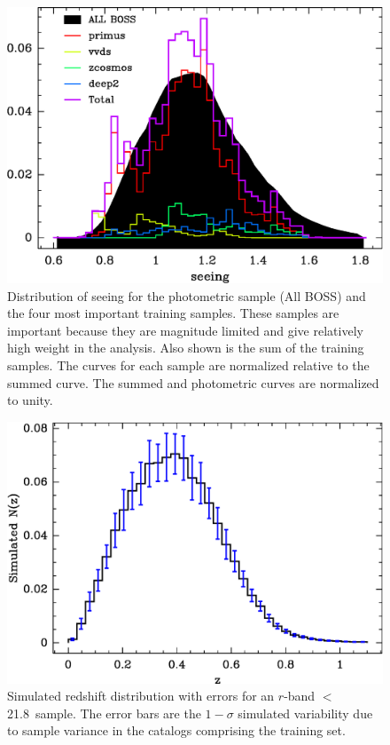 \documentclass[preprint]{aastex}
\newcommand{\rmax}{21.8}
\begin{document}
\begin{figure}[h]\centering
    \includegraphics[scale=0.7]{figures/primus-vvds-zcosmos-deep2-match-seeing-10.eps}

    \caption{Distribution of seeing for the photometric sample (All BOSS) and
    the four most important training samples.  These samples are important
    because they are magnitude limited and give relatively high weight in the
    analysis.  Also shown is the sum of the training samples.  The curves for
    each sample are normalized relative to the summed curve.  The summed and
    photometric curves are normalized to unity.}

    \label{fig:seeing}
\end{figure}

\begin{figure}[t]\centering
    \includegraphics[scale=0.7]{figures/nzsigf-edges-errblue.eps}

    \caption{Simulated redshift distribution with errors for an $r$-band $<$ \rmax\
    sample.  The error bars are the $1-\sigma$ simulated variability due to
    sample variance in the catalogs comprising the training set.}

    \label{fig:ebars}
    \vspace{2em}
\end{figure}
\end{document}
